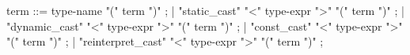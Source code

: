 \begin{syntax}
term ::= type-name "(" term ")"  ;
     |   "static_cast" "<" type-expr ">" "(" term ")" ; 
     |   "dynamic_cast" "<" type-expr ">" "(" term ")" ; 
     |   "const_cast" "<" type-expr ">" "(" term ")" ; 
     |   "reinterpret_cast" "<" type-expr ">" "(" term ")" ; 
\end{syntax}
